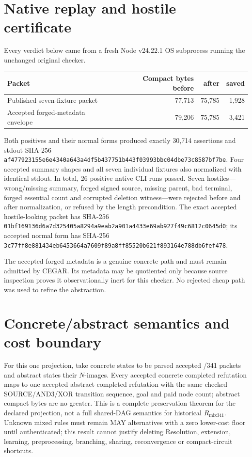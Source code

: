 \documentclass[11pt]{article}
\begin{document}
\section*{Native replay and hostile certificate}
Every verdict below came from a fresh Node v24.22.1 OS subprocess running the unchanged original checker.

\begin{center}
\begin{tabular}{lrrr}
\toprule
Packet & Compact bytes before & after & saved\\
\midrule
Published seven-fixture packet & 77,713 & 75,785 & 1,928\\
Accepted forged-metadata envelope & 79,206 & 75,785 & 3,421\\
\bottomrule
\end{tabular}
\end{center}

Both positives and their normal forms produced exactly 30,714 assertions and stdout SHA-256
\texttt{af477923155e6e4340a643a4df5b437751b443f03993bbc04dbe73c8587bf7be}.  Four accepted summary shapes and all seven individual fixtures also normalized with identical stdout.  In total, 26 positive native CLI runs passed.  Seven hostiles---wrong/missing summary, forged signed source, missing parent, bad terminal, forged essential count and corrupted deletion witness---were rejected before and after normalization, or refused by the length precondition.  The exact accepted hostile-looking packet has SHA-256
\texttt{01bf169136d6a7d325405a8294a9eab2a901a4433e69ab927f49c6812c0645d0}; its accepted normal form has SHA-256
\texttt{3c77ff8e881434eb6453664a7609f89a8ff85520b621f893164e788db6fef478}.

The accepted forged metadata is a genuine concrete path and must remain admitted by CEGAR.  Its metadata may be quotiented only because source inspection proves it observationally inert for this checker.  No rejected cheap path was used to refine the abstraction.

\section*{Concrete/abstract semantics and cost boundary}
For this one projection, take concrete states to be parsed accepted /341 packets and abstract states their $N$-images.  Every accepted concrete completed refutation maps to one accepted abstract completed refutation with the same checked SOURCE/AND3/XOR transition sequence, goal and paid node count; abstract compact bytes are no greater.  This is a complete preservation theorem for the declared projection, not a full shared-DAG semantics for historical $R_{\mathrm{mix341}}$.  Unknown mixed rules must remain MAY alternatives with a zero lower-cost floor until authenticated; this result cannot justify deleting Resolution, extension, learning, preprocessing, branching, sharing, reconvergence or compact-circuit shortcuts.
\end{document}
